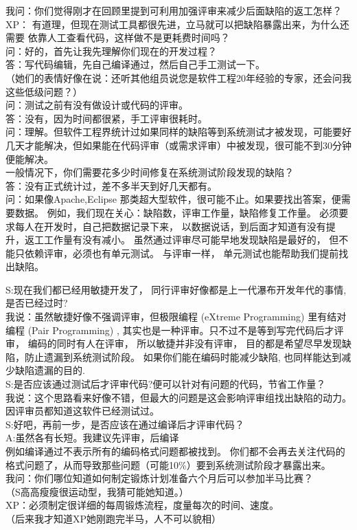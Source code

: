 我问：你们觉得刚才在回顾里提到可利用加强评审来减少后面缺陷的返工怎样？\\
XP：
有道理，但现在测试工具都很先进，立马就可以把缺陷暴露出来，为什么还需要
依靠人工查看代码，这样做不是更耗费时间吗？\\
问：好的，首先让我先理解你们现在的开发过程？\\
答：写代码编辑，先自己编译通过，然后自己手工测试一下。\\
（她们的表情好像在说：还听其他组员说您是软件工程20年经验的专家，还会问我这些低级问题？）\\
问：测试之前有没有做设计或代码的评审。\\
答：没有，因为时间都很紧，手工评审很耗时。\\
问：理解。但软件工程界统计过如果同样的缺陷等到系统测试才被发现，可能要好几天才能解决，但如果能在代码评审（或需求评审）中被发现，很可能不到30分钟便能解决。\\
一般情况下，你们需要花多少时间修复在系统测试阶段发现的缺陷？\\
答：没有正式统计过，差不多半天到好几天都有。\\
问：如果像Apache,Eclipse
那类超大型软件，很可能不止。如果要找出答案，便需要数据。
例如，我们现在关心：缺陷数，评审工作量，缺陷修复工作量。
必须要求每人在开发时，自己把数据记录下来，
以数据说话，到后面才知道有没有提升，返工工作量有没有减小。
虽然通过评审尽可能早地发现缺陷是最好的，
但不能只依赖评审，必须也有单元测试。 与评审一样，
单元测试也能帮助我们提前找出缺陷。

S:现在我们都已经用敏捷开发了， 同行评审好像都是上一代瀑布开发年代的事情,
是否已经过时?\\
我说：虽然敏捷好像不强调评审，但极限编程 (eXtreme Programming)
里有结对编程 (Pair Programming) ,
其实也是一种评审。只不过不是等到写完代码后才评审，
编码的同时有人在评审， 所以敏捷并非没有评审，
目的都是希望尽早发现缺陷，防止遗漏到系统测试阶段。
如果你们能在编码时能减少缺陷, 也同样能达到减少缺陷遗漏的目的.\\
S:是否应该通过测试后才评审代码?便可以针对有问题的代码，节省工作量？\\
我说：这个思路看来好像不错，但最大的问题是这会影响评审组找出缺陷的动力。因评审员都知道这软件已经测试过。\\
S:好吧，再前一步，是否应该在通过编译后才评审代码？\\
A:虽然各有长短。我建议先评审，后编译\\
例如编译通过不表示所有的编码格式问题都被找到。
你们都不会再去关注代码的格式问题了，从而导致那些问题（可能10\%）要到系统测试阶段才暴露出来。\\
我问：你们哪位知道如何制定锻炼计划准备六个月后可以参加半马比赛？\\
（S高高瘦瘦很运动型，我猜可能她知道。）\\
XP：必须制定很详细的每周锻炼流程，度量每次的时间、速度。\\
（后来我才知道XP她刚跑完半马，人不可以貌相）

